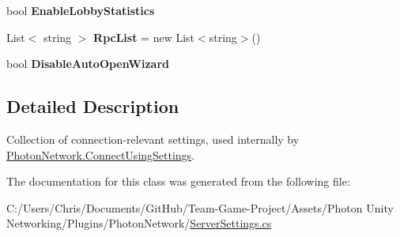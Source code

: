 \begin{DoxyCompactItemize}
\item 
bool {\bfseries Enable\+Lobby\+Statistics}\hypertarget{class_server_settings_a604fa40c04419dd5972f6d6c0710ac44}{}\label{class_server_settings_a604fa40c04419dd5972f6d6c0710ac44}

\item 
List$<$ string $>$ {\bfseries Rpc\+List} = new List$<$string$>$()\hypertarget{class_server_settings_abe34064564018fc67afae2142c244cba}{}\label{class_server_settings_abe34064564018fc67afae2142c244cba}

\item 
bool {\bfseries Disable\+Auto\+Open\+Wizard}\hypertarget{class_server_settings_a0bc41aab7289ce45195f260077b91e48}{}\label{class_server_settings_a0bc41aab7289ce45195f260077b91e48}

\end{DoxyCompactItemize}


\subsection{Detailed Description}
Collection of connection-\/relevant settings, used internally by \hyperlink{class_photon_network_a0fdb79bcce45801ec81fbe56ffb939ec}{Photon\+Network.\+Connect\+Using\+Settings}. 



The documentation for this class was generated from the following file\+:\begin{DoxyCompactItemize}
\item 
C\+:/\+Users/\+Chris/\+Documents/\+Git\+Hub/\+Team-\/\+Game-\/\+Project/\+Assets/\+Photon Unity Networking/\+Plugins/\+Photon\+Network/\hyperlink{_server_settings_8cs}{Server\+Settings.\+cs}\end{DoxyCompactItemize}
